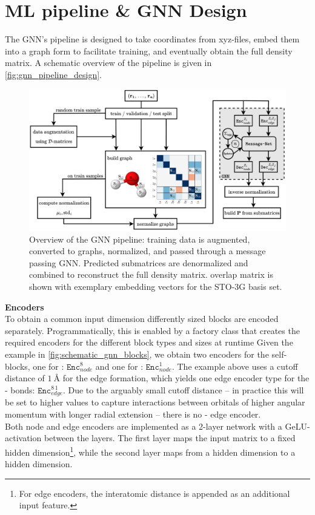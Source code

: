 \section{ML pipeline \& GNN Design}
\label{sec:gnn_design}
The GNN's pipeline is designed to take coordinates from xyz-files, embed them into a graph form to facilitate training, and eventually obtain the full density matrix. A schematic overview of the pipeline is given in \autoref{fig:gnn_pipeline_design}.
\begin{figure}[H]
    \centering
    \includegraphics[width=\textwidth]{../fig/gnn/GNN_design.pdf}
    \caption[GNN pipeline design]{Overview of the GNN pipeline: training data is augmented, converted to graphs, normalized, and passed through a message passing GNN. Predicted submatrices are denormalized and combined to reconstruct the full density matrix.  overlap matrix is shown with exemplary embedding vectors for the STO-3G basis set.}
    \label{fig:gnn_pipeline_design}
\end{figure}
\textbf{Encoders}\\
To obtain a common input dimension differently sized blocks are encoded separately. Programmatically, this is enabled by a factory class that creates the required encoders for the different block types and sizes at runtime Given the  example in \autoref{fig:schematic_gnn_blocks}, we obtain two encoders for the self-blocks, one for : $\texttt{Enc}^{8}_{node}$ and one for : $\texttt{Enc}^{1}_{node}$. The example above uses a cutoff distance of $\SI{1}{\angstrom}$ for the edge formation, which yields one edge encoder type for the - bonds: $\texttt{Enc}^{8\,1}_{edge}$. Due to the arguably small cutoff distance -- in practice this will be set to higher values to capture interactions between orbitals of higher angular momentum with longer radial extension -- there is no - edge encoder. \\
Both node and edge encoders are implemented as a 2-layer network with a GeLU-activation between the layers. The first layer maps the input matrix to a fixed hidden dimension\footnote{For edge encoders, the interatomic distance is appended as an additional input feature.}, while the second layer maps from a hidden dimension to a hidden dimension. 

